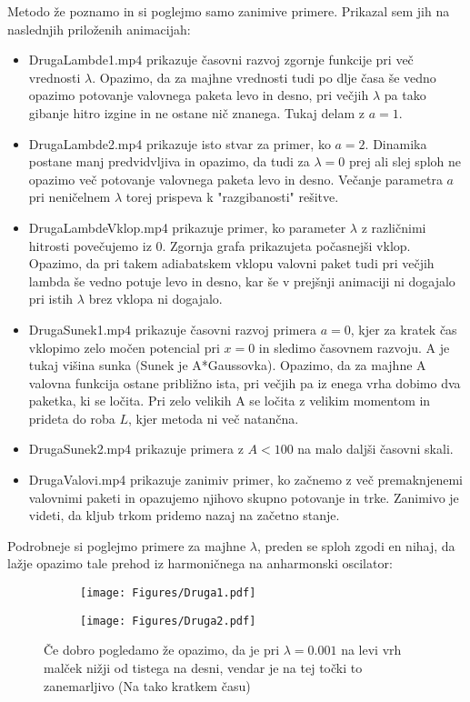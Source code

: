\documentclass{article}
\begin{document}
Metodo že poznamo in si poglejmo samo zanimive primere.
Prikazal sem jih na naslednjih priloženih animacijah:
\begin{itemize}
\item DrugaLambde1.mp4 prikazuje časovni razvoj zgornje funkcije pri več vrednosti $\lambda$. Opazimo, da za majhne vrednosti tudi po dlje časa še vedno opazimo potovanje valovnega paketa levo in desno, pri večjih $\lambda$ pa tako gibanje hitro izgine in ne ostane nič znanega. Tukaj delam z $a=1$.
\item DrugaLambde2.mp4 prikazuje isto stvar za primer, ko $a=2$. Dinamika postane manj predvidvljiva in opazimo, da tudi za $\lambda = 0$ prej ali slej sploh ne opazimo več potovanje valovnega paketa levo in desno. Večanje parametra $a$ pri neničelnem $\lambda$ torej prispeva k "razgibanosti" rešitve.
\item DrugaLambdeVklop.mp4 prikazuje primer, ko parameter $\lambda$ z različnimi hitrosti povečujemo iz 0. Zgornja grafa prikazujeta počasnejši vklop. Opazimo, da pri takem adiabatskem vklopu valovni paket tudi pri večjih lambda še vedno potuje levo in desno, kar še v prejšnji animaciji ni dogajalo pri istih $\lambda$ brez vklopa ni dogajalo.
\item DrugaSunek1.mp4 prikazuje časovni razvoj primera $a=0$, kjer za kratek čas vklopimo zelo močen potencial pri $x=0$ in sledimo časovnem razvoju. A je tukaj višina sunka (Sunek je A*Gaussovka). Opazimo, da za majhne A valovna funkcija ostane približno ista, pri večjih pa iz enega vrha dobimo dva paketka, ki se ločita. Pri zelo velikih A se ločita z velikim momentom in prideta do roba $L$, kjer metoda ni več natančna.
\item DrugaSunek2.mp4 prikazuje primera z $A<100$ na malo daljši časovni skali.
\item DrugaValovi.mp4 prikazuje zanimiv primer, ko začnemo z več premaknjenemi valovnimi paketi in opazujemo njihovo skupno potovanje in trke. Zanimivo je videti, da kljub trkom pridemo nazaj na začetno stanje.
\end{itemize}

Podrobneje si poglejmo primere za majhne $\lambda$, preden se sploh zgodi en nihaj, da lažje opazimo tale prehod iz harmoničnega na anharmonski oscilator:

\begin{figure}[H]
\centering
\begin{subfigure}{.49\textwidth}
\texttt{[image: Figures/Druga1.pdf]}
\end{subfigure}
\begin{subfigure}{.49\textwidth}
\texttt{[image: Figures/Druga2.pdf]}
\end{subfigure}
\caption*{Če dobro pogledamo že opazimo, da je pri $\lambda=0.001$ na levi vrh malček nižji od tistega na desni, vendar je na tej točki to zanemarljivo (Na tako kratkem času)}
\end{figure}
\end{document}
